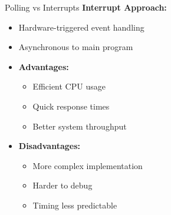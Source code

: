 \begin{concept}{Polling vs Interrupts}
\textbf{Interrupt Approach:}
\begin{itemize}
  \item Hardware-triggered event handling
  \item Asynchronous to main program
  \item \textbf{Advantages:}
    \begin{itemize}
      \item Efficient CPU usage
      \item Quick response times
      \item Better system throughput
    \end{itemize}
  \item \textbf{Disadvantages:}
    \begin{itemize}
      \item More complex implementation
      \item Harder to debug
      \item Timing less predictable
    \end{itemize}
\end{itemize}


\end{concept}
